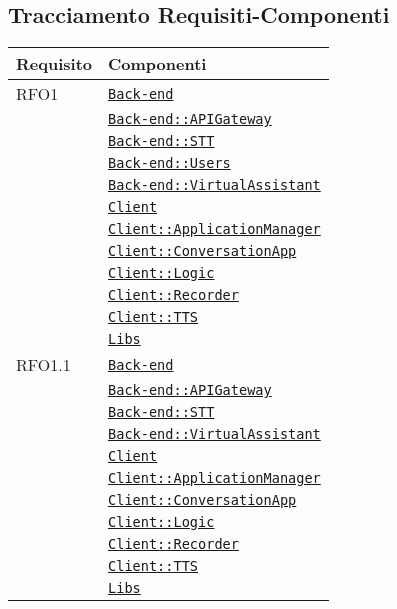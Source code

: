 \subsection{Tracciamento Requisiti-Componenti}
\normalsize
\begin{longtable}{|>{\centering}m{3cm}|m{10cm}<{\centering}|}
\hline 
\textbf{Requisito} & \textbf{Componenti}\\
\hline
\endhead
RFO1 & \hyperref[Back-end]{\texttt{Back-end}}\\
& \hyperref[Back-end::APIGateway]{\texttt{Back-end::APIGateway}}\\
& \hyperref[Back-end::STT]{\texttt{Back-end::STT}}\\
& \hyperref[Back-end::Users]{\texttt{Back-end::Users}}\\
& \hyperref[Back-end::VirtualAssistant]{\texttt{Back-end::VirtualAssistant}}\\
& \hyperref[Client]{\texttt{Client}}\\
& \hyperref[Client::ApplicationManager]{\texttt{Client::ApplicationManager}}\\
& \hyperref[Client::ConversationApp]{\texttt{Client::ConversationApp}}\\
& \hyperref[Client::Logic]{\texttt{Client::Logic}}\\
& \hyperref[Client::Recorder]{\texttt{Client::Recorder}}\\
& \hyperref[Client::TTS]{\texttt{Client::TTS}}\\
& \hyperref[Libs]{\texttt{Libs}}\\ \hline

RFO1.1 & \hyperref[Back-end]{\texttt{Back-end}}\\
& \hyperref[Back-end::APIGateway]{\texttt{Back-end::APIGateway}}\\
& \hyperref[Back-end::STT]{\texttt{Back-end::STT}}\\
& \hyperref[Back-end::VirtualAssistant]{\texttt{Back-end::VirtualAssistant}}\\
& \hyperref[Client]{\texttt{Client}}\\
& \hyperref[Client::ApplicationManager]{\texttt{Client::ApplicationManager}}\\
& \hyperref[Client::ConversationApp]{\texttt{Client::ConversationApp}}\\
& \hyperref[Client::Logic]{\texttt{Client::Logic}}\\
& \hyperref[Client::Recorder]{\texttt{Client::Recorder}}\\
& \hyperref[Client::TTS]{\texttt{Client::TTS}}\\
& \hyperref[Libs]{\texttt{Libs}}\\ \hline


\end{longtable}
